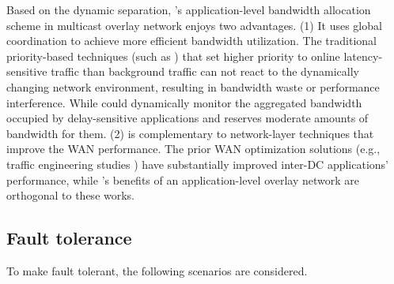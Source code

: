 Based on the dynamic separation, \name's application-level bandwidth allocation scheme in multicast overlay network enjoys two advantages. (1) It uses global coordination to achieve more efficient bandwidth utilization. The traditional priority-based techniques (such as \cite{kumar2015bwe}) that set higher priority to online latency-sensitive traffic than background traffic can not react to the dynamically changing network environment, resulting in bandwidth waste or performance interference. While \name could dynamically monitor the aggregated bandwidth occupied by delay-sensitive applications and reserves moderate amounts of bandwidth for them.
(2) \name is complementary to network-layer techniques that improve the WAN performance. The prior WAN optimization solutions (e.g., traffic engineering studies \cite{chen2012design, kavulya2010analysis, mishra2010towards, reiss2012heterogeneity}) have substantially improved inter-DC applications' performance, while \name's benefits of an application-level overlay network are orthogonal to these works.




\subsection{Fault tolerance}
\label{subsec:system:fault}
To make \name fault tolerant, the following scenarios are considered.%

